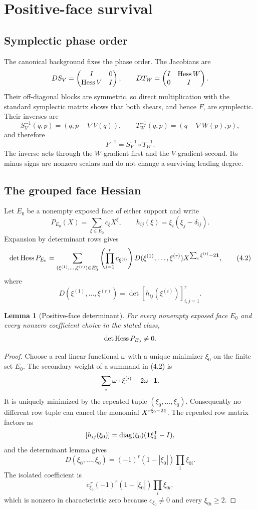 \documentclass[11pt]{article}
\newtheorem{lemma}[theorem]{Lemma}
\theoremstyle{definition}
\theoremstyle{remark}
\begin{document}
\section{Positive-face survival}

\subsection{Symplectic phase order}

The canonical background fixes the phase order.  The Jacobians are
\[
 DS_V=\begin{pmatrix}I&0\\ \operatorname{Hess} V&I\end{pmatrix},\qquad
 DT_W=\begin{pmatrix}I&\operatorname{Hess} W\\0&I\end{pmatrix}.
\]
Their off-diagonal blocks are symmetric, so direct multiplication with the
standard symplectic matrix shows that both shears, and hence \(F\), are
symplectic.  Their inverses are
\[
 S_V^{-1}(q,p)=(q,p-\nabla V(q)),\qquad
 T_W^{-1}(q,p)=(q-\nabla W(p),p),
\]
and therefore
\[
 F^{-1}=S_V^{-1}\circ T_W^{-1}.
\tag{4.1}
\]
The inverse acts through the \(W\)-gradient first and the \(V\)-gradient
second.  Its minus signs are nonzero scalars and do not change a surviving
leading degree.

\subsection{The grouped face Hessian}

Let \(E_0\) be a nonempty exposed face of either support and write
\[
 P_{E_0}(X)=\sum_{\xi\in E_0}c_\xi X^\xi,\qquad
 h_{ij}(\xi)=\xi_i(\xi_j-\delta_{ij}).
\]
Expansion by determinant rows gives
\[
\det\operatorname{Hess} P_{E_0}
=\sum_{(\xi^{(1)},\ldots,\xi^{(r)})\in E_0^r}
 \left(\prod_{i=1}^r c_{\xi^{(i)}}\right)
 D(\xi^{(1)},\ldots,\xi^{(r)})
 X^{\sum_i\xi^{(i)}-2\mathbf{1}},
\tag{4.2}
\]
where
\[
 D(\xi^{(1)},\ldots,\xi^{(r)})
 =\det[h_{ij}(\xi^{(i)})]_{i,j=1}^r.
\]

\begin{lemma}[Positive-face determinant]
\label{lem:hessian}
For every nonempty exposed face \(E_0\) and every nonzero coefficient choice
in the stated class,
\[
 \det\operatorname{Hess} P_{E_0}\neq0.
\]
\end{lemma}

\begin{proof}
Choose a real linear functional \(\omega\) with a unique minimizer
\(\xi_0\) on the finite set \(E_0\).  The secondary weight of a summand in
(4.2) is
\[
 \sum_i\omega\cdot\xi^{(i)}-2\omega\cdot\mathbf{1}.
\]
It is uniquely minimized by the repeated tuple
\((\xi_0,\ldots,\xi_0)\).  Consequently no different row tuple can cancel
the monomial \(X^{r\xi_0-2\mathbf{1}}\).  The repeated row matrix factors as
\[
 [h_{ij}(\xi_0)]
 =\operatorname{diag}(\xi_0)(\mathbf{1}\xi_0^{\mathsf{T}}-I),
\]
and the determinant lemma gives
\[
 D(\xi_0,\ldots,\xi_0)
 =(-1)^r(1-|\xi_0|)\prod_i\xi_{0i}.
\tag{4.3}
\]
The isolated coefficient is
\[
 c_{\xi_0}^{\,r}(-1)^r(1-|\xi_0|)\prod_i\xi_{0i},
\tag{4.4}
\]
which is nonzero in characteristic zero because
\(c_{\xi_0}\neq0\) and every \(\xi_{0i}\geq2\).
\end{proof}
\end{document}
